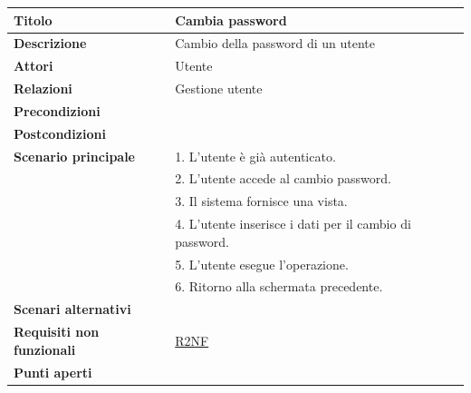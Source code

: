 \documentclass[a4paper]{article}
\begin{document}
\begin{center}
\begin{tabularx}{1\textwidth}{|l|X|}
    \hline
	\textbf{Titolo} & Cambia password \\
	\hline
	\textbf{Descrizione} & Cambio della password di un utente \\
	\hline
	\textbf{Attori} & Utente \\
	\hline
	\textbf{Relazioni} & Gestione utente \\
	\hline
	\textbf{Precondizioni} &  \\
	\hline
	\textbf{Postcondizioni} &  \\
	\hline
	\textbf{Scenario principale} & 1. L'utente è già autenticato.\\
	                             & 2. L'utente accede al cambio password. \\
								 & 3. Il sistema fornisce una vista. \\
								 & 4. L'utente inserisce i dati per il cambio di password. \\
								 & 5. L'utente esegue l'operazione.\\
								 & 6. Ritorno alla schermata precedente.\\
	\hline
	\textbf{Scenari alternativi} & \\
	\hline
	\textbf{Requisiti non funzionali} & \hyperlink{R2NF}{R2NF} \\
	\hline
	\textbf{Punti aperti} & \\
	\hline
\end{tabularx}
\end{center}

\end{document}
